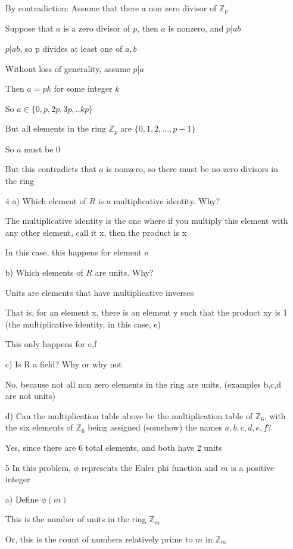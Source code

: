 \documentclass[11pt]{article}
\begin{document}
\begin{itemize}
  By contradiction: Assume that there a non zero divisor of $\mathbb{Z}_p$

  Suppose that $a$ is a zero divisor of $p$, then $a$ is nonzero, and $p|ab$

  $p|ab$, so p divides at least one of $a,b$

  Without loss of generality, assume $p|a$

  Then $a = pk$ for some integer $k$

  So $a \in \{0, p, 2p, 3p, .. kp\}$

  But all elements in the ring $\mathbb{Z}_p$ are $\{0, 1, 2,...,p-1\}$

  So $a$ must be 0

  But this contradicts that $a$ is nonzero, so there must be no zero divisors in the ring

\item[4]
  a) Which element of $R$ is a multiplicative identity. Why?

  The multiplicative identity is the one where if you multiply this element with any other element, call it x, then the product is x

  In this case, this happens for element e

  b) Which elements of $R$ are units. Why?

  Units are elements that have multiplicative inverses

  That is, for an element x, there is an element y such that the product xy is 1 (the multiplicative identity, in this case, e)

  This only happens for e,f

  c) Is R a field? Why or why not

  No, because not all non zero elements in the ring are units, (examples b,c,d are not units)

  d) Can the multiplication table above be the multiplication table of $\mathbb{Z}_6$, with the six elements of $\mathbb{Z}_6$ being assigned (somehow) the names $a,b,c,d,e,f$?

  Yes, since there are 6 total elements, and both have 2 units

\item[5]
  In this problem, $\phi$ represents the Euler phi function and $m$ is a positive integer

  a) Define $\phi(m)$

  This is the number of units in the ring $\mathbb{Z}_m$

  Or, this is the count of numbers relatively prime to $m$ in $\mathbb{Z}_m$


\end{itemize}
\end{document}
